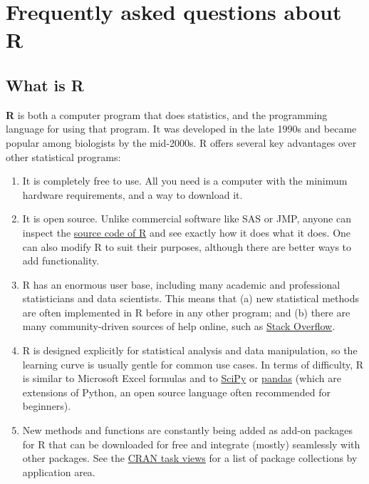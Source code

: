 \documentclass[
  13,
  letterpaper,
]{report}
\begin{document}
\section{Frequently asked questions about R}\label{sec-r-faq}

\subsection{What is R}\label{sec-r-faq-what}

\textbf{R} is both a computer program that does statistics, and the
programming language for using that program. It was developed in the
late 1990s and became popular among biologists by the mid-2000s. R
offers several key advantages over other statistical programs:

\begin{enumerate}
\def\labelenumi{\arabic{enumi}.}
\item
  It is completely free to use. All you need is a computer with the
  minimum hardware requirements, and a way to download it.
\item
  It is open source. Unlike commercial software like SAS or JMP, anyone
  can inspect the \href{https://github.com/wch/r-source}{source code of
  R} and see exactly how it does what it does. One can also modify R to
  suit their purposes, although there are better ways to add
  functionality.
\item
  R has an enormous user base, including many academic and professional
  statisticians and data scientists. This means that (a) new statistical
  methods are often implemented in R before in any other program; and
  (b) there are many community-driven sources of help online, such as
  \href{https://stackoverflow.com/questions/tagged/R}{Stack Overflow}.
\item
  R is designed explicitly for statistical analysis and data
  manipulation, so the learning curve is usually gentle for common use
  cases. In terms of difficulty, R is similar to Microsoft Excel
  formulas and to \href{https://scipy.org/}{SciPy} or
  \href{https://pandas.pydata.org/}{pandas} (which are extensions of
  Python, an open source language often recommended for beginners).
\item
  New methods and functions are constantly being added as add-on
  packages for R that can be downloaded for free and integrate (mostly)
  seamlessly with other packages. See the
  \href{https://cran.r-project.org/web/views/}{CRAN task views} for a
  list of package collections by application area.
\end{enumerate}
\end{document}
